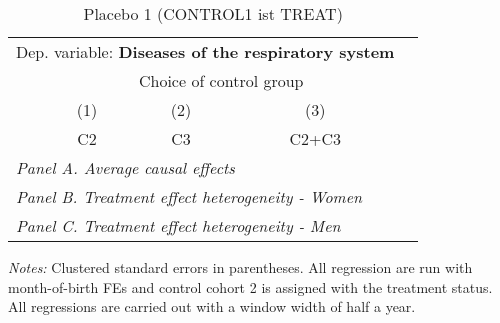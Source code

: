  \begin{table}[H] \centering \begin{threeparttable} \caption{Placebo 1 (CONTROL1 ist TREAT) } {\def\sym#1{\ifmmode^{#1}\else\(^{#1}\)\fi} \begin{tabular}{l*{4}{c}} \toprule \multicolumn{4}{l}{Dep. variable: \textbf{Diseases of the respiratory system}} \\ & \multicolumn{3}{c}{Choice of control group} \\ \cmidrule(lr){2-4}
            &\multicolumn{1}{c}{(1)}&\multicolumn{1}{c}{(2)}&\multicolumn{1}{c}{(3)}\\
            &\multicolumn{1}{c}{C2}&\multicolumn{1}{c}{C3}&\multicolumn{1}{c}{C2+C3}\\
\midrule
 \multicolumn{4}{l}{\emph{Panel A. Average causal effects}} \\      \midrule\multicolumn{4}{l}{\emph{Panel B. Treatment effect heterogeneity - Women}} \\      \midrule\multicolumn{4}{l}{\emph{Panel C. Treatment effect heterogeneity - Men}} \\      
\bottomrule \end{tabular} } \begin{tablenotes} \item \scriptsize \emph{Notes:} Clustered standard errors in parentheses. All regression are run with month-of-birth FEs and control cohort 2 is assigned with the treatment status. All regressions are carried out with a window width of half a year. \end{tablenotes} \end{threeparttable} \end{table} 
